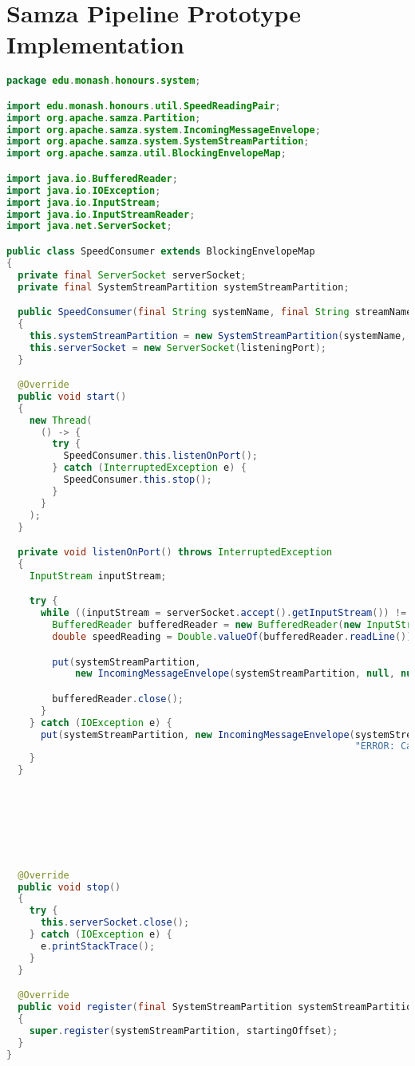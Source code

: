 \chapter{Samza Pipeline Prototype Implementation}
\label{lst:samza}
\begin{lstlisting}[language=java,caption=edu.monash.honours.system.SpeedConsumer (Java)]
package edu.monash.honours.system;

import edu.monash.honours.util.SpeedReadingPair;
import org.apache.samza.Partition;
import org.apache.samza.system.IncomingMessageEnvelope;
import org.apache.samza.system.SystemStreamPartition;
import org.apache.samza.util.BlockingEnvelopeMap;

import java.io.BufferedReader;
import java.io.IOException;
import java.io.InputStream;
import java.io.InputStreamReader;
import java.net.ServerSocket;

public class SpeedConsumer extends BlockingEnvelopeMap
{
  private final ServerSocket serverSocket;
  private final SystemStreamPartition systemStreamPartition;

  public SpeedConsumer(final String systemName, final String streamName, final int listeningPort) throws IOException
  {
    this.systemStreamPartition = new SystemStreamPartition(systemName, streamName, new Partition((0)));
    this.serverSocket = new ServerSocket(listeningPort);
  }

  @Override
  public void start()
  {
    new Thread(
      () -> {
        try {
          SpeedConsumer.this.listenOnPort();
        } catch (InterruptedException e) {
          SpeedConsumer.this.stop();
        }
      }
    );
  }

  private void listenOnPort() throws InterruptedException
  {
    InputStream inputStream;

    try {
      while ((inputStream = serverSocket.accept().getInputStream()) != null) {
        BufferedReader bufferedReader = new BufferedReader(new InputStreamReader(inputStream));
        double speedReading = Double.valueOf(bufferedReader.readLine());

        put(systemStreamPartition,
            new IncomingMessageEnvelope(systemStreamPartition, null, null, new SpeedReadingPair(speedReading, false)));

        bufferedReader.close();
      }
    } catch (IOException e) {
      put(systemStreamPartition, new IncomingMessageEnvelope(systemStreamPartition, null, null,
                                                             "ERROR: Cannot read from port" + e.getMessage()));
    }
  }







  @Override
  public void stop()
  {
    try {
      this.serverSocket.close();
    } catch (IOException e) {
      e.printStackTrace();
    }
  }

  @Override
  public void register(final SystemStreamPartition systemStreamPartition, final String startingOffset)
  {
    super.register(systemStreamPartition, startingOffset);
  }
}
\end{lstlisting}


